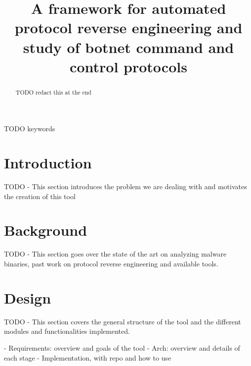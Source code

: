 \documentclass[conference]{IEEEtran}
\begin{document}
\title{A framework for automated protocol reverse engineering and study of botnet command and control protocols
}

\author{
\and
{}
}

\maketitle

\begin{abstract}
TODO redact this at the end
\end{abstract}

\begin{IEEEkeywords}
TODO keywords
\end{IEEEkeywords}

\section{Introduction}
TODO - This section introduces the problem we are dealing with and motivates the creation of this tool

\section{Background}

TODO - This section goes over the state of the art on analyzing malware binaries, past work on protocol reverse 
engineering and available tools. 

\section{Design}
TODO - This section covers the general structure of the tool and the different modules and functionalities implemented.

- Requirements: overview and goals of the tool
- Arch: overview and details of each stage
- Implementation, with repo and how to use
\end{document}
